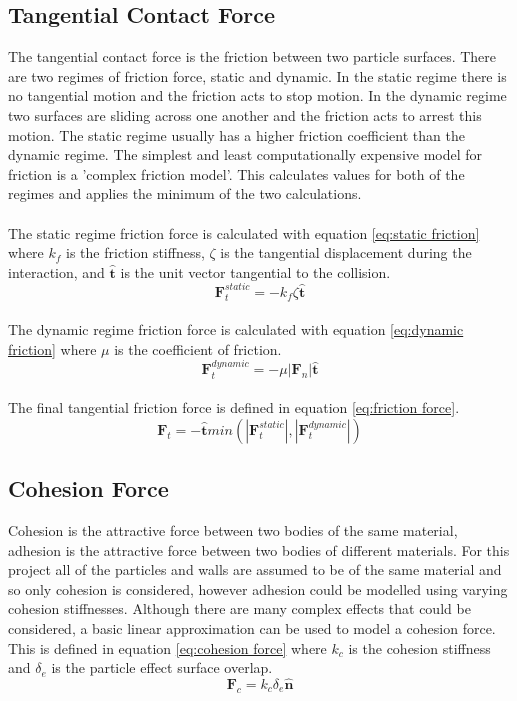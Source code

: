 \documentclass[10pt,a4paper,titlepage]{report}
\begin{document}
\subsection{Tangential Contact Force}
The tangential contact force is the friction between two particle surfaces. There are two regimes of friction force, static and dynamic. In the static regime there is no tangential motion and the friction acts to stop motion. In the dynamic regime two surfaces are sliding across one another and the friction acts to arrest this motion. The static regime usually has a higher friction coefficient than the dynamic regime. The simplest and least computationally expensive model for friction is a 'complex friction model'. This calculates values for both of the regimes and applies the minimum of the two calculations.\cite{tuley}
\\\\The static regime friction force is calculated with equation \ref{eq:static friction} where $k_f$ is the friction stiffness, $\zeta$ is the tangential displacement during the interaction, and $\mathbf{\hat{t}}$ is the unit vector tangential to the collision. 
\begin{equation}
\mathbf{F}_{t}^{static} = - k_{f} \zeta \mathbf{\hat{t}}
\label{eq:static friction}
\end{equation}
\\The dynamic regime friction force is calculated with equation \ref{eq:dynamic friction} where $\mu$ is the coefficient of friction.
\begin{equation}
\mathbf{F}_{t}^{dynamic} = - \mu |\mathbf{F}_{n}| \mathbf{\hat{t}}
\label{eq:dynamic friction}
\end{equation}
\\The final tangential friction force is defined in equation \ref{eq:friction force}.
\begin{equation}
\mathbf{F}_{t} = -\mathbf{\hat{t}}min(|\mathbf{F}_{t}^{static}|, |\mathbf{F}_{t}^{dynamic}|)
\label{eq:friction force}
\end{equation}
\subsection{Cohesion Force}
Cohesion is the attractive force between two bodies of the same material, adhesion is the attractive force between two bodies of different materials. For this project all of the particles and walls are assumed to be of the same material and so only cohesion is considered, however adhesion could be modelled using varying cohesion stiffnesses. Although there are many complex effects that could be considered\cite{tuley}, a basic linear approximation can be used to model a cohesion force. This is defined in equation \ref{eq:cohesion force} where $k_c$ is the cohesion stiffness and $\delta_e$ is the particle effect surface overlap.
\begin{equation}
\mathbf{F}_{c} = k_{c} \delta_{e} \mathbf{\hat{n}}
\label{eq:cohesion force}
\end{equation}
\end{document}
